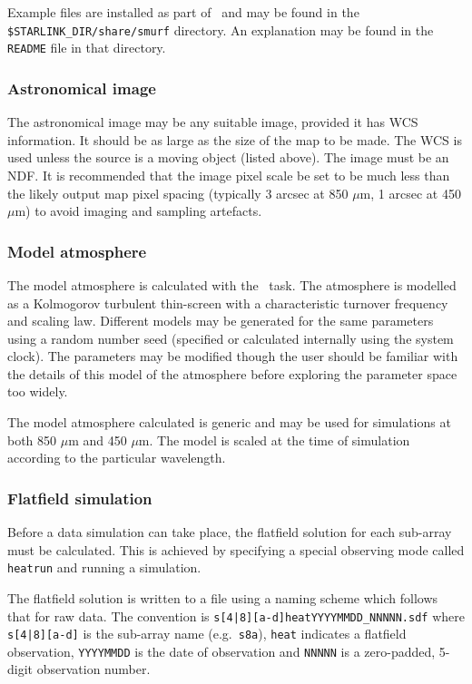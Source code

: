 \documentclass[oneside,11pt]{starlink}
\begin{document}
Example files are installed as part of \SMURF\ and may be found in the
\texttt{\$STARLINK\_DIR/share/smurf} directory. An explanation may be
found in the \texttt{README} file in that directory.

\subsubsection{Astronomical image}

The astronomical image may be any suitable image, provided it has WCS
information. It should be as large as the size of the map to be
made. The WCS is used unless the source is a moving object (listed
above). The image must be an NDF. It is recommended that the image
pixel scale be set to be much less than the likely output map pixel
spacing (typically 3 arcsec at 850 $\mu$m, 1 arcsec at 450 $\mu$m) to
avoid imaging and sampling artefacts.

\subsubsection{Model atmosphere}

The model atmosphere is calculated with the \skynoise\ task. The
atmosphere is modelled as a Kolmogorov turbulent thin-screen
\cite{sc2ana002} with a characteristic turnover frequency and scaling
law. Different models may be generated for the same parameters using a
random number seed (specified or calculated internally using the
system clock). The parameters may be modified though the user should
be familiar with the details of this model of the atmosphere before
exploring the parameter space too widely.

The model atmosphere calculated is generic and may be used for
simulations at both 850 $\mu$m and 450 $\mu$m. The model is scaled
at the time of simulation according to the particular wavelength.

\subsubsection{Flatfield simulation}

Before a data simulation can take place, the flatfield solution for
each sub-array must be calculated. This is achieved by specifying a
special observing mode called \texttt{heatrun} and running a
simulation.

The flatfield solution is written to a file using a naming scheme
which follows that for raw data. The convention is
\verb+s[4|8][a-d]heatYYYYMMDD_NNNNN.sdf+ where \verb+s[4|8][a-d]+ is
the sub-array name (e.g.\ \verb+s8a+), \verb+heat+ indicates a
flatfield observation, \verb+YYYYMMDD+ is the date of observation and
\verb+NNNNN+ is a zero-padded, 5-digit observation number.
\end{document}

